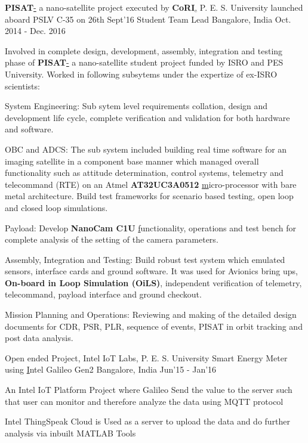 
\begin{cventries}
	\cventry
	{\textbf{PISAT}\href{http://pisat.pes.edu/}- a nano-satellite project executed by \textbf{CoRI}\href{http://cori.pes.edu/}, P. E. S. University launched aboard PSLV C-35 on 26th Sept'16}
	{Student Team Lead}
	{Bangalore, India}
	{Oct. 2014 - Dec. 2016}
	{
		\begin{cvitems}
		\item{Involved in complete design, development, assembly, integration and testing phase of \textbf{PISAT}\href{https://www.isro.gov.in/Spacecraft/pisat} - a nano-satellite student project funded by ISRO and PES University. Worked in following subsytems under the expertize of ex-ISRO scientists:}
		\item{System Engineering: Sub sytem level requirements collation, design and development life cycle, complete verification and validation for both hardware and software.}
		\item{OBC and ADCS: The sub system included building real time software for an imaging satellite in a component base manner which managed overall functionality such as attitude determination, control systems, telemetry and telecommand (RTE) on an Atmel \textbf{AT32UC3A0512 }\href{https://www.microchip.com/wwwproducts/en/AT32UC3A0512} micro-processor with bare metal architecture. Build test frameworks for scenario based testing, open loop and closed loop simulations.}
		\item{Payload: Develop \textbf{NanoCam C1U }\href{https://gomspace.com/UserFiles/Subsystems/datasheet/gs-ds-nanocam-c1u-17.pdf} functionality, operations and test bench for complete analysis of the setting of the camera parameters.}
		\item{Assembly, Integration and Testing: Build robust test system which emulated sensors, interface cards and ground software. It was used for Avionics bring ups, \textbf{On-board in Loop Simulation (OiLS)}, independent verification of telemetry, telecommand, payload interface and ground checkout.}
		\item{Mission Planning and Operations: Reviewing and making of the detailed design documents for CDR, PSR, PLR, sequence of events, PISAT in orbit tracking and post data analysis.}
		\end{cvitems}
	}
\end{cventries}
\begin{cventries}
	\cventry
	{Open ended Project, Intel IoT Labs, P. E. S. University}
	{Smart Energy Meter using \href{https://www.arduino.cc/en/ArduinoCertified/IntelGalileoGen2}Intel Galileo Gen2}
	{Bangalore, India}
	{Jun'15 - Jan'16}
	{
		\begin{cvitems}
		\item{An Intel IoT Platform Project where Galileo Send the value to the server such that user can monitor and therefore analyze the data using MQTT protocol}
		\item{Intel ThingSpeak Cloud is Used as a server to upload the data and do further analysis via inbuilt MATLAB Tools}
		\end{cvitems}
	}
\end{cventries}
